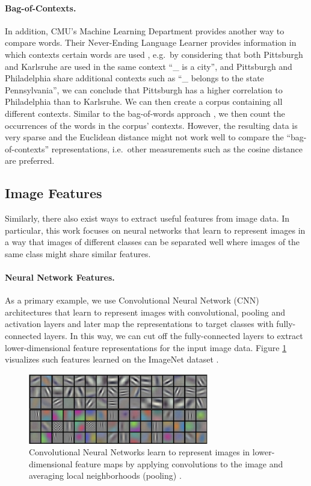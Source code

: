 \paragraph{Bag-of-Contexts.} In addition, CMU's Machine Learning Department provides another way to compare words. Their Never-Ending Language Learner provides information in which contexts certain words are used \cite{nell_pairs}, e.g.\ by considering that both Pittsburgh and Karlsruhe are used in the same context ``\_ is a city'', and Pittsburgh and Philadelphia share additional contexts such as ``\_ belongs to the state Pennsylvania'', we can conclude that Pittsburgh has a higher correlation to Philadelphia than to Karlsruhe. We can then create a corpus containing all different contexts. Similar to the bag-of-words approach \cite{bow}, we then count the occurrences of the words in the corpus' contexts. However, the resulting data is very sparse and the Euclidean distance might not work well to compare the ``bag-of-contexts'' representations, i.e.\ other measurements such as the cosine distance are preferred.

\subsection{Image Features}
\label{sec:imagefeatures}

Similarly, there also exist ways to extract useful features from image data. In particular, this work focuses on neural networks that learn to represent images in a way that images of different classes can be separated well where images of the same class might share similar features. 

\paragraph{Neural Network Features.} As a primary example, we use Convolutional Neural Network (CNN) architectures that learn to represent images with convolutional, pooling and activation layers and later map the representations to target classes with fully-connected layers. In this way, we can cut off the fully-connected layers to extract lower-dimensional feature representations for the input image data. Figure \ref{fig:cnnfeatures} visualizes such features learned on the ImageNet dataset \cite{krizhevsky2012imagenet}.

\begin{figure}[h]
    \centering
    \includegraphics[width=0.7\textwidth]{images/cnn_features}
    \caption{Convolutional Neural Networks learn to represent images in lower-dimensional feature maps by applying convolutions to the image and averaging local neighborhoods (pooling) \cite{krizhevsky2012imagenet}.}
    \label{fig:cnnfeatures}
\end{figure}

